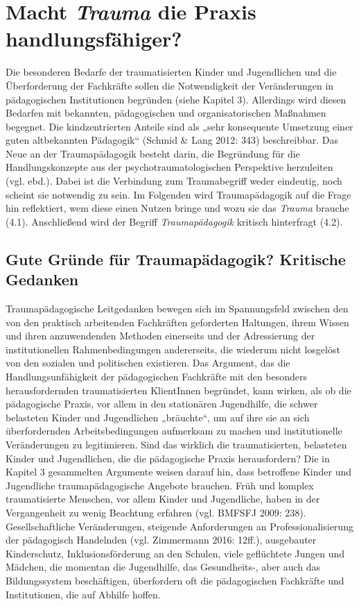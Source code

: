 \section{Macht \textit{Trauma} die Praxis handlungsfähiger?}
Die besonderen Bedarfe der traumatisierten Kinder und Jugendlichen und die Überforderung der Fachkräfte sollen die Notwendigkeit der Veränderungen in pädagogischen Institutionen begründen (siehe Kapitel 3). Allerdings wird diesen Bedarfen mit bekannten, pädagogischen und organisatorischen Maßnahmen begegnet. Die kindzentrierten Anteile sind als „sehr konsequente Umsetzung einer guten altbekannten Pädagogik“ (Schmid \& Lang 2012: 343) beschreibbar. Das Neue an der Traumapädagogik besteht darin, die Begründung für die Handlungskonzepte aus der psychotraumatologischen Perspektive herzuleiten (vgl. ebd.). Dabei ist die Verbindung zum Traumabegriff weder eindeutig, noch scheint sie notwendig zu sein. Im Folgenden wird Traumapädagogik auf die Frage hin reflektiert, wem diese einen Nutzen bringe und wozu sie das \textit{Trauma} brauche (4.1). Anschließend wird der Begriff \textit{Traumapädagogik} kritisch hinterfragt (4.2).

\subsection{Gute Gründe für Traumapädagogik? Kritische Gedanken}
Traumapädagogische Leitgedanken bewegen sich im Spannungsfeld zwischen den von den praktisch arbeitenden Fachkräften geforderten Haltungen, ihrem Wissen und ihren anzuwendenden Methoden einerseits und der Adressierung der institutionellen Rahmenbedingungen andererseits, die wiederum nicht losgelöst von den sozialen und politischen existieren. Das Argument, das die Handlungsunfähigkeit der pädagogischen Fachkräfte mit den besonders herausfordernden traumatisierten KlientInnen begründet, kann wirken, als ob die pädagogische Praxis, vor allem in den stationären Jugendhilfe, die schwer belasteten Kinder und Jugendlichen „bräuchte“, um auf ihre sie an sich überfordernden Arbeitsbedingungen aufmerksam zu machen und institutionelle Veränderungen zu legitimieren. Sind das wirklich die traumatisierten, belasteten Kinder und Jugendlichen, die die pädagogische Praxis herausfordern? Die in Kapitel 3 gesammelten Argumente weisen darauf hin, dass betroffene Kinder und Jugendliche traumapädagogische Angebote brauchen. Früh und komplex traumatisierte Menschen, vor allem Kinder und Jugendliche, haben in der Vergangenheit zu wenig Beachtung erfahren (vgl. BMFSFJ 2009: 238). Gesellschaftliche Veränderungen, steigende Anforderungen an Professionalisierung der pädagogisch Handelnden (vgl. Zimmermann 2016: 12ff.), ausgebauter Kinderschutz, Inklusionsförderung an den Schulen, viele geflüchtete Jungen und Mädchen, die momentan die Jugendhilfe, das Gesundheits-, aber auch das Bildungssystem beschäftigen, überfordern oft die pädagogischen Fachkräfte und Institutionen, die auf Abhilfe hoffen.

